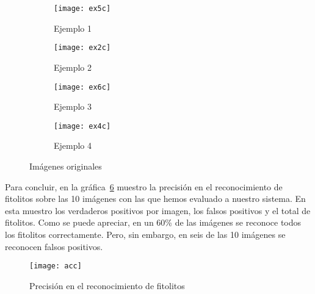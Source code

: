\begin{figure}
	\centering
	\begin{subfigure}[b]{0.45\textwidth}
        \texttt{[image: ex5c]}
        \caption{Ejemplo 1}
        \label{subfig:fej1c}
    \end{subfigure}
    \begin{subfigure}[b]{0.45\textwidth}
        \texttt{[image: ex2c]}
        \caption{Ejemplo 2}
        \label{subfig:fej2c}
    \end{subfigure}
    \begin{subfigure}[b]{0.45\textwidth}
        \texttt{[image: ex6c]}
        \caption{Ejemplo 3}
        \label{subfig:fe3c}
    \end{subfigure}
    \begin{subfigure}[b]{0.45\textwidth}
        \texttt{[image: ex4c]}
        \caption{Ejemplo 4}
        \label{subfig:fe4c}
    \end{subfigure}
        \caption{Imágenes originales}
	\label{fig:5.18}
\end{figure}

Para concluir, en la gráfica~\ref{fig:acc} muestro la precisión en el reconocimiento de fitolitos sobre las 10 imágenes con las que hemos evaluado a nuestro sistema. En esta muestro los verdaderos positivos por imagen, los falsos positivos y el total de fitolitos. Como se puede apreciar, en un 60\% de las imágenes se reconoce todos los fitolitos correctamente. Pero, sin embargo, en seis de las 10 imágenes se reconocen falsos positivos.

\begin{figure}
\centering
\texttt{[image: acc]}
\caption{Precisión en el reconocimiento de fitolitos}
\label{fig:acc}
\end{figure}